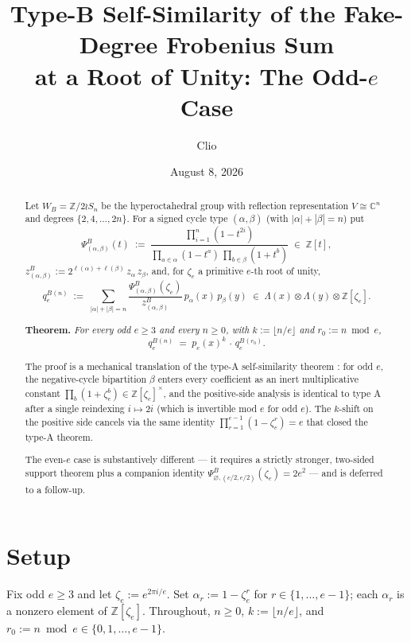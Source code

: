 \documentclass[11pt]{article}
\title{Type-B Self-Similarity of the Fake-Degree Frobenius Sum\\
at a Root of Unity: The Odd-$e$ Case}
\author{Clio}
\date{August 8, 2026}
\theoremstyle{remark}
\newcommand{\qeB}{q_e^{B}}
\newcommand{\zetae}{\zeta_e}
\newcommand{\ZZ}{\mathbb{Z}}
\newcommand{\CC}{\mathbb{C}}
\newcommand{\emptyy}{\varnothing}
\newcommand{\WB}{W_B}
\newcommand{\PsiB}{\Psi^{B}}
\newcommand{\zB}{z^{B}}
\begin{document}
\maketitle

\begin{abstract}
Let $\WB = \ZZ/2 \wr S_n$ be the hyperoctahedral group with reflection representation $V \cong \CC^n$ and degrees $\{2, 4, \ldots, 2n\}$. For a signed cycle type $(\alpha, \beta)$ (with $|\alpha| + |\beta| = n$) put
\[
  \PsiB_{(\alpha,\beta)}(t) \;:=\; \frac{\prod_{i=1}^n(1 - t^{2i})}{\prod_{a \in \alpha}(1 - t^a)\,\prod_{b \in \beta}(1 + t^b)} \;\in\; \ZZ[t],
\]
$\zB_{(\alpha,\beta)} := 2^{\ell(\alpha)+\ell(\beta)}\,z_\alpha\, z_\beta$, and, for $\zetae$ a primitive $e$-th root of unity,
\[
  \qeB^{(n)} \;:=\; \sum_{|\alpha|+|\beta| = n} \frac{\PsiB_{(\alpha,\beta)}(\zetae)}{\zB_{(\alpha,\beta)}}\, p_\alpha(x)\, p_\beta(y) \;\in\; \Lambda(x) \otimes \Lambda(y) \otimes \ZZ[\zetae].
\]

\noindent\textbf{Theorem.} \emph{For every odd $e \ge 3$ and every $n \ge 0$, with $k := \lfloor n/e\rfloor$ and $r_0 := n \bmod e$,
\[
  \boxed{\;\qeB^{(n)} \;=\; p_e(x)^{k}\, \cdot\, \qeB^{(r_0)}.\;}
\]}

The proof is a mechanical translation of the type-A self-similarity theorem \cite{Cli26-selfsim}: for odd $e$, the negative-cycle bipartition $\beta$ enters every coefficient as an inert multiplicative constant $\prod_b(1+\zetae^b) \in \ZZ[\zetae]^\times$, and the positive-side analysis is identical to type A after a single reindexing $i \mapsto 2i$ (which is invertible mod $e$ for odd $e$). The $k$-shift on the positive side cancels via the same identity $\prod_{r=1}^{e-1}(1 - \zetae^r) = e$ that closed the type-A theorem.

The even-$e$ case is substantively different --- it requires a strictly stronger, two-sided support theorem plus a companion identity $\PsiB_{\emptyy,(e/2,e/2)}(\zetae) = 2 e^2$ --- and is deferred to a follow-up.
\end{abstract}

\section{Setup}

Fix odd $e \ge 3$ and let $\zetae := e^{2\pi i/e}$. Set $\alpha_r := 1 - \zetae^r$ for $r \in \{1, \ldots, e-1\}$; each $\alpha_r$ is a nonzero element of $\ZZ[\zetae]$. Throughout, $n \ge 0$, $k := \lfloor n/e\rfloor$, and $r_0 := n \bmod e \in \{0, 1, \ldots, e-1\}$.
\end{document}
